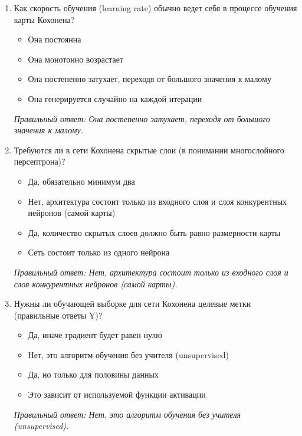 \begin{enumerate}[label=\textbf{\arabic*.}, leftmargin=0pt, itemsep=1.2em]
\item Как скорость обучения (learning rate) обычно ведет себя в процессе обучения карты Кохонена?
\begin{itemize}[label=$\square$, leftmargin=1.5cm, itemsep=0.2em, topsep=0.3em]
\item Она постоянна
\item Она монотонно возрастает
\item Она постепенно затухает, переходя от большого значения к малому
\item Она генерируется случайно на каждой итерации
\end{itemize}
{\small\textit{Правильный ответ: Она постепенно затухает, переходя от большого значения к малому.}}

\item Требуются ли в сети Кохонена скрытые слои (в понимании многослойного персептрона)?
\begin{itemize}[label=$\square$, leftmargin=1.5cm, itemsep=0.2em, topsep=0.3em]
\item Да, обязательно минимум два
\item Нет, архитектура состоит только из входного слоя и слоя конкурентных нейронов (самой карты)
\item Да, количество скрытых слоев должно быть равно размерности карты
\item Сеть состоит только из одного нейрона
\end{itemize}
{\small\textit{Правильный ответ: Нет, архитектура состоит только из входного слоя и слоя конкурентных нейронов (самой карты).}}

\item Нужны ли обучающей выборке для сети Кохонена целевые метки (правильные ответы Y)?
\begin{itemize}[label=$\square$, leftmargin=1.5cm, itemsep=0.2em, topsep=0.3em]
\item Да, иначе градиент будет равен нулю
\item Нет, это алгоритм обучения без учителя (unsupervised)
\item Да, но только для половины данных
\item Это зависит от используемой функции активации
\end{itemize}
{\small\textit{Правильный ответ: Нет, это алгоритм обучения без учителя (unsupervised).}}


\end{enumerate}
